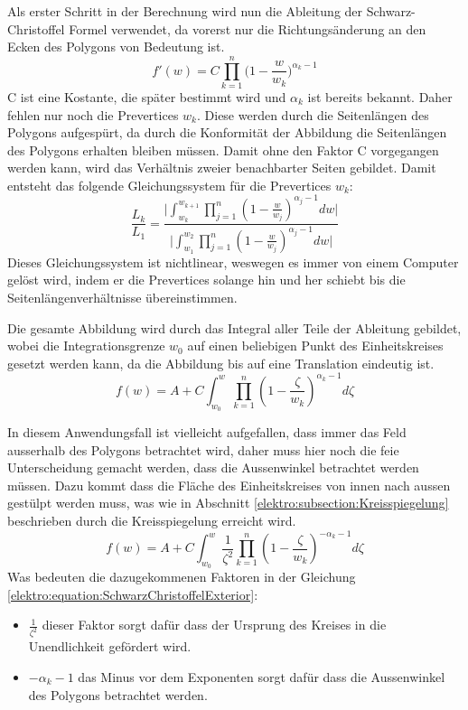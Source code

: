 Als erster Schritt in der Berechnung wird nun die Ableitung der Schwarz-Christoffel Formel verwendet, da vorerst nur die Richtungsänderung an den Ecken des Polygons von Bedeutung ist. 
\begin{equation}
	f'(w) = C \prod_{k=1}^{n} \biggl(1-\frac{w}{w_k}\biggr)^{\alpha_k-1}
	\label{elektro:equation:SchwarzChristoffelDerivative}
\end{equation}
C ist eine Kostante, die später bestimmt wird und $\alpha_k$ ist bereits bekannt.
Daher fehlen nur noch die Prevertices $w_k$.
Diese werden durch die Seitenlängen des Polygons aufgespürt, da durch die Konformität der Abbildung die Seitenlängen des Polygons erhalten bleiben müssen. 
Damit ohne den Faktor C vorgegangen werden kann, wird das Verhältnis zweier benachbarter Seiten gebildet.
Damit entsteht das folgende Gleichungssystem für die Prevertices $w_k$:
\begin{equation}
	\frac{L_k}{L_1} = \frac{\bigg\vert \int_{w_k}^{w_{k+1}} \prod_{j=1}^{n}(1-\frac{w}{w_j})^{\alpha_j-1} dw \bigg\vert}{\bigg\vert \int_{w_1}^{w_2} \prod_{j=1}^{n}(1-\frac{w}{w_j})^{\alpha_j-1} dw \bigg\vert}
	\label{elektro:equation:SchwarzChristoffelPrevertices}
\end{equation}
Dieses Gleichungssystem ist nichtlinear, weswegen es immer von einem Computer gelöst wird, indem er die Prevertices solange hin und her schiebt bis die Seitenlängenverhältnisse übereinstimmen.

Die gesamte Abbildung wird durch das Integral aller Teile der Ableitung gebildet, wobei die Integrationsgrenze $w_0$ auf einen beliebigen Punkt des Einheitskreises gesetzt werden kann, da die Abbildung bis auf eine Translation eindeutig ist.
\begin{equation}
	f(w) = A + C \int_{w_0}^{w} \prod_{k=1}^{n}(1-\frac{\zeta}{w_k})^{\alpha_k-1} d\zeta
	\label{elektro:equation:SchwarzChristoffel}
\end{equation}

In diesem Anwendungsfall ist vielleicht aufgefallen, dass immer das Feld ausserhalb des Polygons betrachtet wird, daher muss hier noch die feie Unterscheidung gemacht werden, dass die Aussenwinkel betrachtet werden müssen. 
Dazu kommt dass die Fläche des Einheitskreises von innen nach aussen gestülpt werden muss, was wie in Abschnitt \ref{elektro:subsection:Kreisspiegelung} beschrieben durch die Kreisspiegelung erreicht wird. 
\begin{equation}
	f(w) = A + C \int_{w_0}^{w} \frac{1}{{\zeta}^2}\prod_{k=1}^{n}(1-\frac{\zeta}{w_k})^{-\alpha_k-1} d\zeta
	\label{elektro:equation:SchwarzChristoffelExterior}
\end{equation}
Was bedeuten die dazugekommenen Faktoren in der Gleichung \ref{elektro:equation:SchwarzChristoffelExterior}:
\begin{itemize}
	\item $\frac{1}{\zeta^2} $ dieser Faktor sorgt dafür dass der Ursprung des Kreises in die Unendlichkeit gefördert wird.
	\item $-\alpha_k-1$ das Minus vor dem Exponenten sorgt dafür dass die Aussenwinkel des Polygons betrachtet werden.
\end{itemize}

